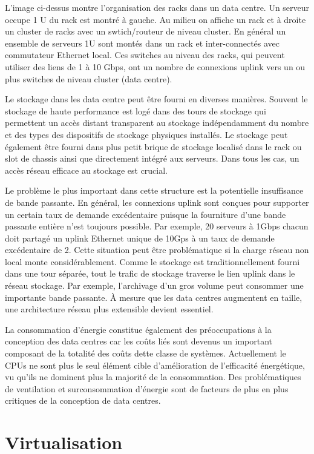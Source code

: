 L'image ci-dessus montre l'organisation des racks dans un data centre. Un serveur occupe 1 U du rack est montré à gauche. Au milieu on affiche un rack et à droite un cluster de racks avec un swtich/routeur de niveau cluster. En général un ensemble de serveurs 1U sont montés dans un rack et inter-connectés avec commutateur Ethernet local. Ces switches au niveau des racks, qui peuvent utiliser des liens de 1 à 10 Gbps, ont un nombre de connexions uplink vers un ou plus switches de niveau cluster (data centre).

Le stockage dans les data centre peut être fourni en diverses manières. Souvent le stockage de haute performance est logé dans des \og  tours de stockage \fg{} qui permettent un accès distant transparent au stockage indépendamment du nombre et des types des dispositifs de stockage physiques installés. Le stockage peut également être fourni dans  plus petit \og  brique de stockage \fg{} localisé dans le rack ou slot de chassis ainsi que directement intégré aux serveurs. Dans tous les cas, un accès réseau efficace au stockage est crucial.

Le problème le plus important dans cette structure est la potentielle insuffisance de bande passante. En général, les connexions uplink sont conçues pour supporter un certain taux de 
demande excédentaire puisque la fourniture d'une bande passante entière n'est toujours possible. Par exemple, 20 serveurs à 1Gbps chacun doit partagé un uplink Ethernet unique de 10Gps à un taux de demande excédentaire de 2. Cette situation peut être problématique si la charge réseau non local monte considérablement. Comme le stockage est traditionnellement fourni dans une tour séparée, tout le trafic de stockage traverse le lien uplink dans le réseau stockage. Par exemple, l'archivage d'un gros volume peut consommer une importante bande passante. À mesure que les data centres augmentent en taille, une architecture réseau plus extensible devient essentiel.

La consommation d'énergie constitue également des préoccupations à la conception des data centres car les coûts liés sont devenus un important composant de la totalité des coûts dette classe de systèmes. Actuellement le CPUs ne sont plus le seul élément cible d'amélioration de l'efficacité énergétique, vu qu'ils ne dominent plus la majorité de la consommation. Des problématiques de ventilation et surconsommation d'énergie sont de facteurs de plus en plus critiques de la conception de data centres.


\section{Virtualisation}

